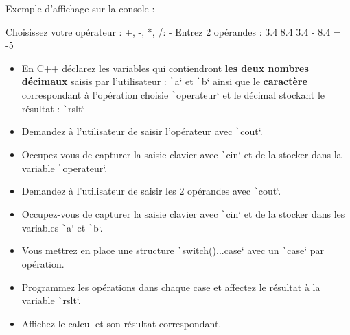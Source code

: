 \documentclass[10pt]{article}
\begin{document}
Exemple d'affichage sur la console :
\begin{textcode}
    Choisissez votre opérateur : +, -, *, /: -    
    Entrez 2 opérandes : 3.4 8.4
    3.4 - 8.4 = -5
\end{textcode}

\begin{itemize}
    \item En C++ déclarez les variables qui contiendront \textbf{les deux nombres décimaux} saisis par l'utilisateur : \texttt`a` et \texttt`b` ainsi que le \textbf{caractère} correspondant à l'opération choisie \texttt`operateur` et le décimal stockant le résultat : \texttt`rslt` 
    \item Demandez à l'utilisateur de saisir l'opérateur avec \texttt`cout`. 
    \item Occupez-vous de capturer la saisie clavier avec \texttt`cin` et de la stocker dans la variable \texttt`operateur`.
    \item Demandez à l'utilisateur de saisir les 2 opérandes avec \texttt`cout`. 
    \item Occupez-vous de capturer la saisie clavier avec \texttt`cin` et de la stocker dans les variables \texttt`a` et \texttt`b`.
    \item Vous mettrez en place une structure \texttt`switch()...case` avec un \texttt`case` par opération.
    \item Programmez les opérations dans chaque case et affectez le résultat à la variable \texttt`rslt`. 
    \item Affichez le calcul et son résultat correspondant.
\end{itemize}    
\end{document}
